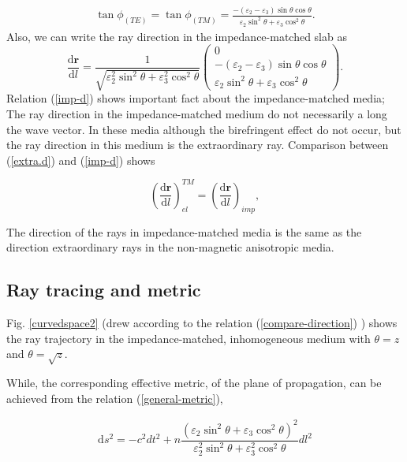 \documentclass[9pt,twocolumn,twoside]{osajnl}
\begin{document}
\begin{align}\label{tanp}
\tan{\phi}_{(TE)}=\tan{\phi}_{(TM)}=\frac{-(\varepsilon_{2}-\varepsilon_{3})\sin{\theta}\cos{\theta}}{\varepsilon_{2} \sin^{2}{\theta} + \varepsilon_{3}\cos^{2}{\theta}}.
\end{align}
Also, we can write the ray direction in the impedance-matched slab as 
\begin{equation}\label{imp-d}
\dfrac{\mathbf{\mathrm{d}{r}}}{\mathrm{d}{l}}=\dfrac{1}{\sqrt{\varepsilon_{2}^{2} \sin^{2}{\theta} + \varepsilon_{3}^{2}\cos^{2}{\theta}}}
 \begin{pmatrix}
 0\\ -(\varepsilon_{2}-\varepsilon_{3})\sin{\theta}\cos{\theta}  \\  \varepsilon_{2} \sin^{2}{\theta} + \varepsilon_{3}\cos^{2}{\theta}
 \end{pmatrix}.
\end{equation}
Relation (\ref{imp-d})  shows important fact about the impedance-matched media; The ray direction in the impedance-matched medium do not necessarily a long the wave vector. In these media although the birefringent effect do not occur, but the ray direction in this medium is the extraordinary ray.  Comparison between (\ref{extra.d}) and (\ref{imp-d}) shows  

\begin{equation}\label{compare-direction}
\left(\dfrac{\mathbf{\mathrm{d}{r}}}{\mathrm{d}{l}}\right)_{el}^{TM}= \left(\dfrac{\mathbf{\mathrm{d}{r}}}{\mathrm{d}{l}}\right)_{imp},
\end{equation}

The direction of the rays in impedance-matched media is the same as the direction extraordinary rays in the non-magnetic anisotropic media.

\subsection{Ray tracing and metric}

Fig. \ref{curvedspace2} (drew according to the relation (\ref{compare-direction}) ) shows the ray trajectory in the impedance-matched, inhomogeneous medium with  $\theta=z$ and $\theta=\sqrt{z}$.

While, the corresponding effective metric, of the plane of propagation, can be achieved from the relation (\ref{general-metric}),

\begin{eqnarray}
\mathrm{d}s^{2}=-c^{2}dt^{2}+ n\dfrac{\left(\varepsilon_{2} \sin^{2}{\theta} + \varepsilon_{3}\cos^{2}{\theta}\right)^{2}}{\varepsilon_{2}^{2} \sin^{2}{\theta} + \varepsilon_{3}^{2}\cos^{2}{\theta}}dl^{2}
\end{eqnarray}
\end{document}
